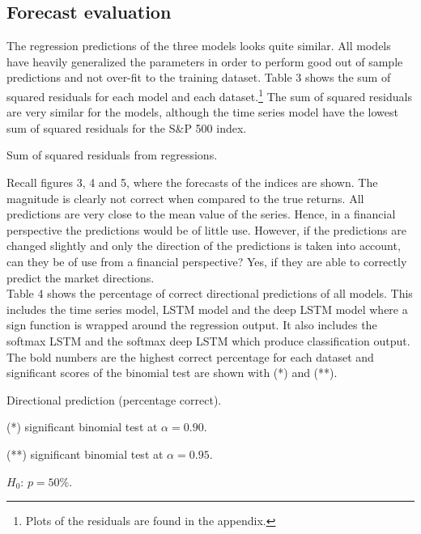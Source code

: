 \documentclass[12pt, letterpaper]{amsart}%
\begin{document}
\subsection{Forecast evaluation}
The regression predictions of the three models looks quite similar. All models have heavily generalized the parameters in order to perform good out of sample predictions and not over-fit to the training dataset. Table 3 shows the sum of squared residuals for each model and each dataset.\footnote{Plots of the residuals are found in the appendix.} The sum of squared residuals are very similar for the models, although the time series model have the lowest sum of squared residuals for the S\&P 500 index.

\begin{table}[h]%
\centering
\caption{Sum of squared residuals from regressions.}
\end{table}

Recall figures 3, 4 and 5, where the forecasts of the indices are shown. The magnitude is clearly not correct when compared to the true returns. All predictions are very close to the mean value of the series. Hence, in a financial perspective the predictions would be of little use. However, if the predictions are changed slightly and only the direction of the predictions is taken into account, can they be of use from a financial perspective? Yes, if they are able to correctly predict the market directions.
\\

Table 4 shows the percentage of correct directional predictions of all models. This includes the time series model, LSTM model and the deep LSTM model where a sign function is wrapped around the regression output. It also includes the softmax LSTM and the softmax deep LSTM which produce classification output. The bold numbers are the highest correct percentage for each dataset and significant scores of the binomial test are shown with (*) and (**).
\\

\begin{table}[h]%
\centering
\caption{Directional prediction (percentage correct).}
	\begin{tablenotes}
	\small
	\item  (*) significant binomial test at $\alpha=0.90$.
	\item (**) significant binomial test at $\alpha=0.95$.
	\item $H_0$: $p = 50\%$.
	\end{tablenotes}
\end{table}
\end{document}
